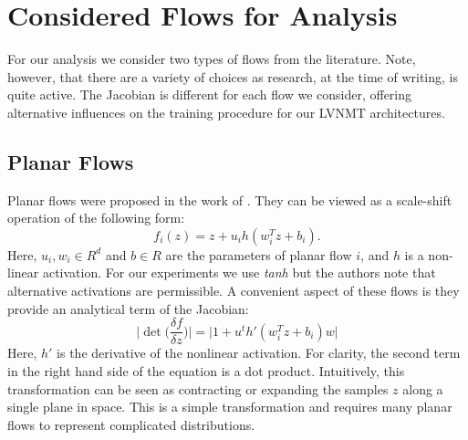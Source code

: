 



\section{Considered Flows for Analysis}

For our analysis we consider two types of flows from the literature. Note, however, that there are a variety of choices as research, at the time of writing, is quite active. The Jacobian is different for each flow we consider, offering alternative influences on the training procedure for our \ac{LVNMT} architectures. 

\subsection{Planar Flows}

Planar flows were proposed in the work of \citet{rezende2015VIwithNF}. They can be viewed as a scale-shift operation of the following form:
\begin{equation}
f_{i}(z) = z + u_{i} h(w_{i}^{T} z + b_{i}).
\end{equation}
Here, $u_{i}, w_{i} \in R^{d}$ and $b \in R$ are the parameters of planar flow $i$, and $h$ is a non-linear activation. For our experiments we use \textit{tanh} but the authors note that alternative activations are permissible. A convenient aspect of these flows is they provide an analytical term of the Jacobian:
\begin{equation}
\bigg| \det \bigg( \frac{\delta f}{\delta z} \bigg)\bigg|  = \bigg| 1 + u^{t} h'(w_{i}^{T} z + b_{i})w \bigg|
\end{equation} 
Here, $h'$ is the derivative of the nonlinear activation. For clarity, the second term in the right hand side of the equation is a dot product. Intuitively, this transformation can be seen as contracting or expanding the samples $z$ along a single plane in space. This is a simple transformation and requires many planar flows to represent complicated distributions.  %

